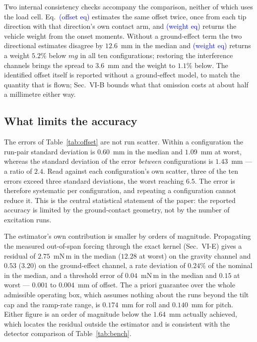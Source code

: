 \documentclass[10pt]{article}
\newcommand{\pl}[1]{\textcolor{blue}{(#1)}}
\begin{document}
Two internal consistency checks accompany the comparison, neither of
which uses the load cell. Eq.~\pl{offset eq} estimates the same
offset twice, once from each tip direction with that direction's own
contact arm, and \pl{weight eq} returns the vehicle weight from the
onset moments. Without a ground-effect term the two directional
estimates disagree by $12.6$~mm in the median and \pl{weight eq}
returns a weight $5.2\%$ below $mg$ in all ten configurations;
restoring the interference channels brings the spread to $3.6$~mm and
the weight to $1.1\%$ below. The identified offset itself is reported
without a ground-effect model, to match the quantity that is flown;
Sec.~VI-B bounds what that omission costs at about half a millimetre
either way.

\subsection*{What limits the accuracy}

The errors of Table~\ref{tab:offset} are not run scatter. Within a
configuration the run-pair standard deviation is $0.60$~mm in the
median and $1.09$~mm at worst, whereas the standard deviation of the
error \emph{between} configurations is $1.43$~mm --- a ratio of
$2.4$. Read against each configuration's own scatter, three of the ten
errors exceed three standard deviations, the worst reaching $6.5$.
The error is therefore systematic per configuration, and repeating a
configuration cannot reduce it. This is the central statistical
statement of the paper: the reported accuracy is limited by the
ground-contact geometry, not by the number of excitation runs.

The estimator's own contribution is smaller by orders of magnitude.
Propagating the measured out-of-span forcing through the exact kernel
(Sec.~VI-E) gives a residual of $2.75$~mN\,m in the median
($12.28$ at worst) on the gravity channel and $0.53$ ($3.20$) on the
ground-effect channel, a rate deviation of $0.24\%$ of the nominal in
the median, and a threshold error of $0.04$~mN\,m in the median and
$0.15$ at worst --- $0.001$ to $0.004$~mm of offset. The a priori
guarantee over the whole admissible operating box, which assumes
nothing about the runs beyond the tilt cap and the ramp-rate range,
is $0.174$~mm for roll and $0.140$~mm for pitch. Either figure is an
order of magnitude below the $1.64$~mm actually achieved, which
locates the residual outside the estimator and is consistent with the
detector comparison of Table~\ref{tab:bench}.
\end{document}
